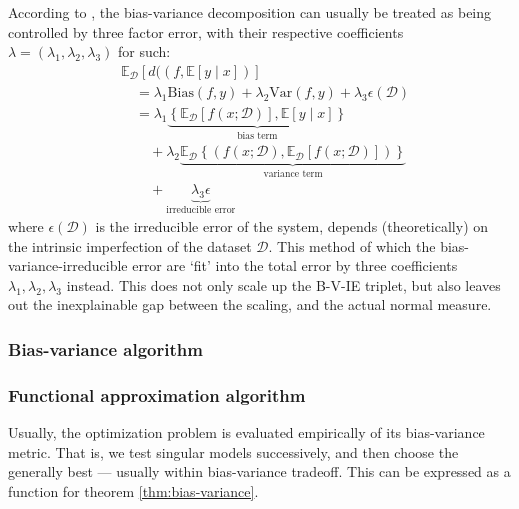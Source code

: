 \documentclass[
  journal=largetwo,
  year=2025,
  volume=37,
]{cup-journal}
\begin{document}
According to \cite{domingos_unified_aaai_2000,domingos_unified_2000}, the bias-variance decomposition can usually be treated as being controlled by three factor error, with their respective coefficients $\lambda=(\lambda_{1},\lambda_{2},\lambda_{3})$ for such: 
    \noindent 
    \begin{equation*}
        \begin{split}
            &\mathbb{E}_{\mathcal{D}} \left[d((f,\mathbb{E}[y\mid x])\right] \\
            & \quad = \lambda_{1} \mathrm{Bias}(f,y) + \lambda_{2}\mathrm{Var}(f,y)+ \lambda_{3}\epsilon(\mathcal{D})\\ 
            & \quad = \lambda_{1}\underbrace{\left\{ \mathbb{E}_{\mathcal{D}}[f(x;\mathcal{D})] , \mathbb{E}[y\mid x] \right\}}_{\text{bias term}} \\
            &\quad\quad +\lambda_{2} \underbrace{\mathbb{E}_{\mathcal{D}} \left\{(f(x;\mathcal{D}), \mathbb{E}_{\mathcal{D}}[f(x;\mathcal{D})])\right\}}_{\text{variance term}} \\
            &\quad\quad +\underbrace{\lambda_{3}\epsilon}_{\text{irreducible error}}
        \end{split}
        \end{equation*}
where $\epsilon(\mathcal{D})$ is the irreducible error of the system, depends (theoretically) on the intrinsic imperfection of the dataset $\mathcal{D}$. This method of which the bias-variance-irreducible error are `fit' into the total error by three coefficients $\lambda_{1},\lambda_{2},\lambda_{3}$ instead. This does not only scale up the B-V-IE triplet, but also leaves out the inexplainable gap between the scaling, and the actual normal measure. 

\subsubsection{Bias-variance algorithm}

\subsubsection{Functional approximation algorithm}

Usually, the optimization problem is evaluated empirically of its bias-variance metric. That is, we test singular models successively, and then choose the generally best --- usually within bias-variance tradeoff. This can be expressed as a function for theorem \ref{thm:bias-variance}. 
\end{document}

